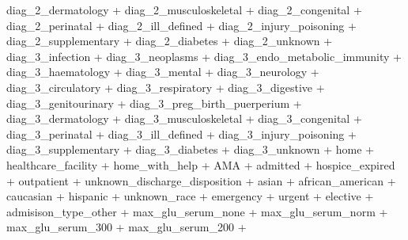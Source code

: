 \documentclass[
]{article}
\newenvironment{Shaded}{\begin{snugshade}}{\end{snugshade}}
\newcommand{\NormalTok}[1]{#1}
\newcommand{\SpecialCharTok}[1]{\textcolor[rgb]{0.00,0.00,0.00}{#1}}
\begin{document}
\begin{Shaded}
\begin{Highlighting}[]
\NormalTok{        diag\_2\_dermatology }\SpecialCharTok{+}\NormalTok{ diag\_2\_musculoskeletal }\SpecialCharTok{+}
\NormalTok{        diag\_2\_congenital }\SpecialCharTok{+}\NormalTok{ diag\_2\_perinatal }\SpecialCharTok{+}\NormalTok{ diag\_2\_ill\_defined }\SpecialCharTok{+}
\NormalTok{        diag\_2\_injury\_poisoning }\SpecialCharTok{+}\NormalTok{ diag\_2\_supplementary }\SpecialCharTok{+}
\NormalTok{        diag\_2\_diabetes }\SpecialCharTok{+}\NormalTok{ diag\_2\_unknown }\SpecialCharTok{+}\NormalTok{ diag\_3\_infection }\SpecialCharTok{+}
\NormalTok{        diag\_3\_neoplasms }\SpecialCharTok{+}\NormalTok{ diag\_3\_endo\_metabolic\_immunity }\SpecialCharTok{+}
\NormalTok{        diag\_3\_haematology }\SpecialCharTok{+}\NormalTok{ diag\_3\_mental }\SpecialCharTok{+}\NormalTok{ diag\_3\_neurology }\SpecialCharTok{+}
\NormalTok{        diag\_3\_circulatory }\SpecialCharTok{+}\NormalTok{ diag\_3\_respiratory }\SpecialCharTok{+}\NormalTok{ diag\_3\_digestive }\SpecialCharTok{+}
\NormalTok{        diag\_3\_genitourinary }\SpecialCharTok{+}\NormalTok{ diag\_3\_preg\_birth\_puerperium }\SpecialCharTok{+}
\NormalTok{        diag\_3\_dermatology }\SpecialCharTok{+}\NormalTok{ diag\_3\_musculoskeletal }\SpecialCharTok{+}
\NormalTok{        diag\_3\_congenital }\SpecialCharTok{+}\NormalTok{ diag\_3\_perinatal }\SpecialCharTok{+}\NormalTok{ diag\_3\_ill\_defined }\SpecialCharTok{+}
\NormalTok{        diag\_3\_injury\_poisoning }\SpecialCharTok{+}\NormalTok{ diag\_3\_supplementary }\SpecialCharTok{+}
\NormalTok{        diag\_3\_diabetes }\SpecialCharTok{+}\NormalTok{ diag\_3\_unknown }\SpecialCharTok{+}\NormalTok{ home }\SpecialCharTok{+}\NormalTok{ healthcare\_facility }\SpecialCharTok{+}
\NormalTok{        home\_with\_help }\SpecialCharTok{+}\NormalTok{ AMA }\SpecialCharTok{+}\NormalTok{ admitted }\SpecialCharTok{+}\NormalTok{ hospice\_expired }\SpecialCharTok{+}
\NormalTok{        outpatient }\SpecialCharTok{+}\NormalTok{ unknown\_discharge\_disposition }\SpecialCharTok{+}
\NormalTok{        asian }\SpecialCharTok{+}\NormalTok{ african\_american }\SpecialCharTok{+}\NormalTok{ caucasian }\SpecialCharTok{+}\NormalTok{ hispanic }\SpecialCharTok{+}
\NormalTok{        unknown\_race }\SpecialCharTok{+}\NormalTok{ emergency }\SpecialCharTok{+}\NormalTok{ urgent }\SpecialCharTok{+}\NormalTok{ elective }\SpecialCharTok{+}
\NormalTok{        admisison\_type\_other }\SpecialCharTok{+}\NormalTok{ max\_glu\_serum\_none }\SpecialCharTok{+}
\NormalTok{        max\_glu\_serum\_norm }\SpecialCharTok{+}\NormalTok{ max\_glu\_serum\_300 }\SpecialCharTok{+}\NormalTok{ max\_glu\_serum\_200 }\SpecialCharTok{+}

\end{Highlighting}
\end{Shaded}
\end{document}
